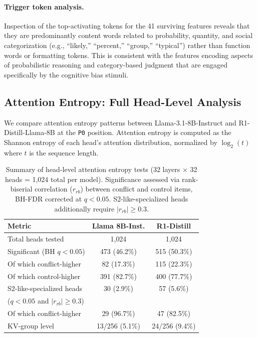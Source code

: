 \documentclass{article}
\newcommand{\stwo}{S2-like}
\newcommand{\pzero}{\texttt{P0}}
\begin{document}
\paragraph{Trigger token analysis.}
Inspection of the top-activating tokens for the 41 surviving features
reveals that they are predominantly content words related to
probability, quantity, and social categorization (e.g., ``likely,''
``percent,'' ``group,'' ``typical'') rather than function words or
formatting tokens.  This is consistent with the features encoding
aspects of probabilistic reasoning and category-based judgment that
are engaged specifically by the cognitive bias stimuli.

\subsection{Attention Entropy: Full Head-Level Analysis}

We compare attention entropy patterns between Llama-3.1-8B-Instruct
and R1-Distill-Llama-8B at the \pzero{} position.  Attention entropy
is computed as the Shannon entropy of each head's attention
distribution, normalized by $\log_2(t)$ where $t$ is the sequence
length.

\begin{table}[ht]
\centering
\caption{Summary of head-level attention entropy tests (32 layers
  $\times$ 32 heads = 1{,}024 total per model).  Significance assessed
  via rank-biserial correlation ($r_{rb}$) between conflict and control
  items, BH-FDR corrected at $q < 0.05$.  \stwo{}-specialized heads
  additionally require $|r_{rb}| \geq 0.3$.}
\label{tab:app_attention_summary}
\vspace{4pt}
\small
\begin{tabular}{lcc}
\toprule
\textbf{Metric} & \textbf{Llama 8B-Inst.} & \textbf{R1-Distill} \\
\midrule
Total heads tested                 & 1{,}024 & 1{,}024 \\
Significant (BH $q < 0.05$)       & 473 (46.2\%) & 515 (50.3\%) \\
\quad Of which conflict-higher     & 82 (17.3\%) & 115 (22.3\%) \\
\quad Of which control-higher      & 391 (82.7\%) & 400 (77.7\%) \\
\midrule
\stwo{}-specialized heads          & 30 (2.9\%)  & 57 (5.6\%) \\
\quad ($q < 0.05$ and $|r_{rb}| \geq 0.3$) & & \\
\quad Of which conflict-higher     & 29 (96.7\%) & 47 (82.5\%) \\
\quad KV-group level               & 13/256 (5.1\%)  & 24/256 (9.4\%) \\
\bottomrule
\end{tabular}
\end{table}
\end{document}
